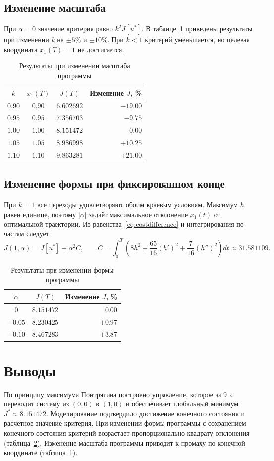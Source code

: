 \documentclass[12pt,a4paper]{article}
\begin{document}
\subsection{Изменение масштаба}
При $\alpha=0$ значение критерия равно $k^2J[u^*]$.
В таблице~\ref{tab:scale} приведены результаты при изменении $k$ на
$\pm5\%$ и $\pm10\%$. При $k<1$ критерий уменьшается, но целевая
координата $x_1(T)=1$ не достигается.

\begin{table}[H]
  \centering
  \caption{Результаты при изменении масштаба программы}
  \label{tab:scale}
  \begin{tabular}{|c|c|c|r|}
    \hline
    $k$ & $x_1(T)$ & $J(T)$ & Изменение $J$, \% \\ \hline
    $0.90$ & $0.90$ & $6.602692$ & $-19.00$ \\
    $0.95$ & $0.95$ & $7.356703$ & $-9.75$ \\
    $1.00$ & $1.00$ & $8.151472$ & $0.00$ \\
    $1.05$ & $1.05$ & $8.986998$ & $+10.25$ \\
    $1.10$ & $1.10$ & $9.863281$ & $+21.00$ \\ \hline
  \end{tabular}
\end{table}

\subsection{Изменение формы при фиксированном конце}
При $k=1$ все переходы удовлетворяют обоим краевым условиям.
Максимум $h$ равен единице, поэтому $\lvert\alpha\rvert$ задаёт
максимальное отклонение $x_1(t)$ от оптимальной траектории.
Из равенства~\eqref{eq:costdifference} и интегрирования по частям следует
\[
  J(1,\alpha)=J[u^*]+\alpha^2 C,\qquad
  C=\int_0^T\left(8h^2+\frac{65}{16}(h')^2+\frac{7}{16}(h'')^2\right)dt
    \approx31.581109 .
\]

\begin{table}[H]
  \centering
  \caption{Результаты при изменении формы программы}
  \label{tab:shape}
  \begin{tabular}{|c|c|r|}
    \hline
    $\alpha$ & $J(T)$ & Изменение $J$, \% \\ \hline
    $0$ & $8.151472$ & $0.00$ \\
    $\pm0.05$ & $8.230425$ & $+0.97$ \\
    $\pm0.10$ & $8.467283$ & $+3.87$ \\ \hline
  \end{tabular}
\end{table}

\section{Выводы}
По принципу максимума Понтрягина построено управление, которое за
$9$~с переводит систему из $(0,0)$ в $(1,0)$ и обеспечивает
глобальный минимум $J^*\approx8.151472$. Моделирование подтвердило
достижение конечного состояния и расчётное значение критерия.
При изменении формы программы с сохранением конечного состояния
критерий возрастает пропорционально квадрату отклонения
(таблица~\ref{tab:shape}). Изменение масштаба программы приводит к промаху
по конечной координате (таблица~\ref{tab:scale}).
\end{document}
